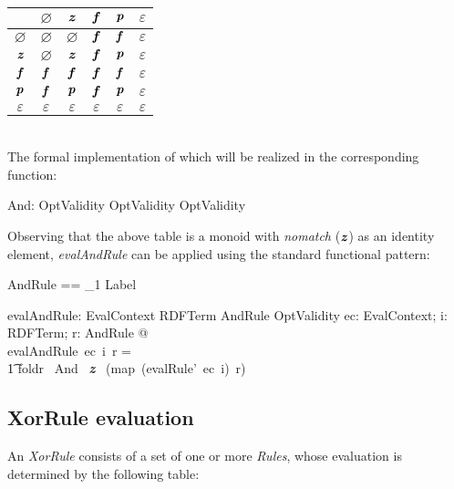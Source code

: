 \documentclass[fuzz]{llncs}
\def\pass{\textbf{\textit{p}}}
\def\fail{\textbf{\textit{f}}}
\def\dunno{\varnothing}
\def\error{\varepsilon}
\def\nomatch{\textbf{\textit{z}}}
\def\zc{\textit}
\def\zcb{\textit{\textbf}}
\begin{document}
\begin{tabular}{c || c | c | c | c | c |}
   \hline 
   \zcb{And} & $\dunno$ & $\nomatch$ & $\fail$ & $\pass$ & $\error$ \\
   \hline \hline
   $\dunno$ & $\dunno$ & $\dunno$ & $\fail$ & $\fail$ & $\error$ \\ \hline
   $\nomatch$ & $\dunno$ & $\nomatch$ & $\fail$ & $\pass$ & $\error$ \\ \hline
   $\fail$ & $\fail$ & $\fail$ & $\fail$ & $\fail$ & $\error$ \\ \hline
   $\pass$ & $\fail$ & $\pass$ & $\fail$ & $\pass$ & $\error$ \\ \hline
   $\error$ & $\error$ & $\error$ & $\error$ & $\error$ & $\error$ \\ \hline 
\end{tabular} \\

The formal implementation of which will be realized in the corresponding function:
\begin{gendef}
   And: OptValidity \fun OptValidity \fun OptValidity
\end{gendef}

Observing that the above table is a monoid with \zc{nomatch} ($\nomatch$) as an identity
element, \zc{evalAndRule} can be applied using the standard functional pattern:
\begin{zed}
AndRule == \seq_1 Label
\end{zed}
\begin{gendef}
   evalAndRule: EvalContext \fun RDFTerm \fun AndRule \fun OptValidity
\where
   \forall ec: EvalContext; i: RDFTerm; r: AndRule  @ \\
	evalAndRule~ec~i~r = \\
\t1	foldr~ And~ \nomatch ~ (map~(evalRule'~ec~i)~r)
\end{gendef}

\subsection{XorRule evaluation}
An \zc{XorRule} consists of a set of one or more \zc{Rules}, whose evaluation is determined
by the following table: \\
\end{document}
